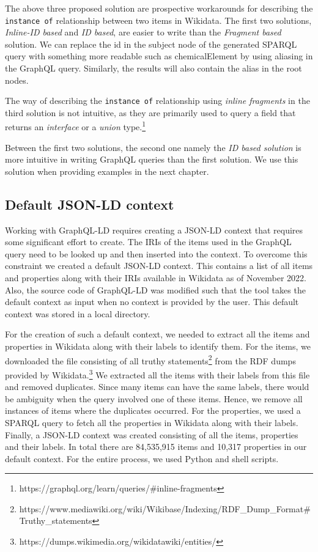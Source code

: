 The above three proposed solution are prospective workarounds for describing the \texttt{instance of} relationship between two items in Wikidata. The first two solutions, \textit{Inline-ID based} and \textit{ID based}, are easier to write than the \textit{Fragment based} solution. We can replace the id in the subject node of the generated SPARQL query with something more readable such as chemicalElement by using aliasing in the GraphQL query. Similarly, the results will also contain the alias in the root nodes. 

The way of describing the \texttt{instance of} relationship using \textit{inline fragments} in the third solution  is not intuitive, as they are primarily used to query a field that returns an \textit{interface} or a \textit{union} type.\footnote{https://graphql.org/learn/queries/\#inline-fragments} 

Between the first two solutions, the second one namely the \textit{ID based solution} is more intuitive in writing GraphQL queries than the first solution.  We use this solution when providing examples in the next chapter.

\subsection{Default JSON-LD context}

Working with GraphQL-LD requires creating a JSON-LD context that requires some significant effort to create. The IRIs of the items used in the GraphQL query need to be looked up and then inserted into the context. To overcome this constraint we created a default JSON-LD context. This contains a list of all items and properties along with their IRIs available in Wikidata as of November 2022. Also, the source code of GraphQL-LD was modified such that the tool takes the default context as input when no context is provided by the user. This default context was stored in a local directory.

For the creation of such a default context, we needed to extract all the items and properties in Wikidata along with their labels to identify them. For the items, we downloaded the file consisting of all truthy statements\footnote{https://www.mediawiki.org/wiki/Wikibase/Indexing/RDF\_Dump\_Format\#Truthy\_statements} from the RDF dumps provided by Wikidata.\footnote{https://dumps.wikimedia.org/wikidatawiki/entities/} We extracted all the items with their labels from this file and removed duplicates. Since many items can have the same labels, there would be ambiguity when the query involved one of these items. Hence, we remove all instances of items where the duplicates occurred. For the properties, we used a SPARQL query to fetch all the properties in Wikidata along with their labels. Finally, a JSON-LD context was created consisting of all the items, properties and their labels. In total there are 84,535,915 items and 10,317 properties in our default context. For the entire process, we used Python and shell scripts.

